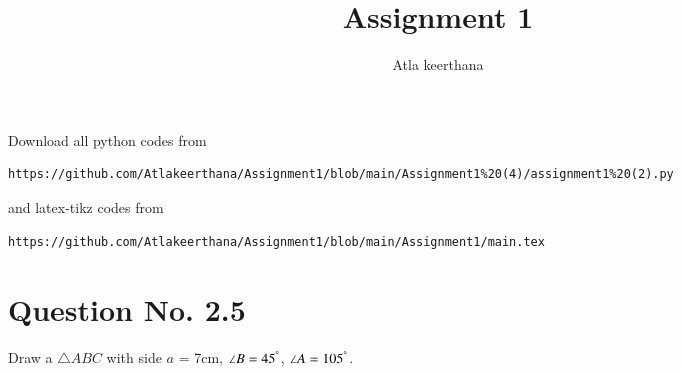 \documentclass[journal,12pt,twocolumn]{IEEEtran}
\begin{document}
     \def\rightbox#1{\makebox[0in][r]{#1}}
     \def\centbox#1{\makebox[0in]{#1}}
     \def\topbox#1{\raisebox{-\baselineskip}[0in][0in]{#1}}
     \def\midbox#1{\raisebox{-0.5\baselineskip}[0in][0in]{#1}}
\vspace{3cm}
\title{Assignment 1}
\author{Atla keerthana}
\maketitle
\newpage
\bigskip
\renewcommand{\thefigure}{\theenumi}
\renewcommand{\thetable}{\theenumi}
Download all python codes from 
\begin{lstlisting}
https://github.com/Atlakeerthana/Assignment1/blob/main/Assignment1%20(4)/assignment1%20(2).py
\end{lstlisting}
%
and latex-tikz codes from 
%
\begin{lstlisting}
https://github.com/Atlakeerthana/Assignment1/blob/main/Assignment1/main.tex
\end{lstlisting}
\section{Question No. 2.5}
Draw a $\triangle ABC$ with side $a$ = 7cm, $\angle B = 45^{\degree}$, $\angle A = 105^{\degree}$.
\end{document}

